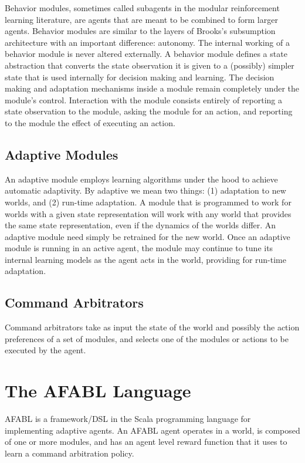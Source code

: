 Behavior modules, sometimes called subagents in the modular reinforcement learning literature, are agents that are meant to be combined to form larger agents.  Behavior modules are similar to the layers of Brooks's subsumption architecture with an important difference: autonomy.  The internal working of a behavior module is never altered externally.  A behavior module defines a state abstraction that converts the state observation it is given to a (possibly) simpler state that is used internally for decision making and learning.  The decision making and adaptation mechanisms inside a module remain completely under the module's control.  Interaction with the module consists entirely of reporting a state observation to the module, asking the module for an action, and reporting to the module the effect of executing an action.

\subsection{Adaptive Modules}

An adaptive module employs learning algorithms under the hood to achieve automatic adaptivity.  By adaptive we mean two things: (1) adaptation to new worlds, and (2) run-time adaptation.  A module that is programmed to work for worlds with a given state representation will work with any world that provides the same state representation, even if the dynamics of the worlds differ.  An adaptive module need simply be retrained for the new world.  Once an adaptive module is running in an active agent, the module may continue to tune its internal learning models as the agent acts in the world, providing for run-time adaptation.

\subsection{Command Arbitrators}

Command arbitrators take as input the state of the world and possibly the action preferences of a set of modules, and selects one of the modules or actions to be executed by the agent.

\section{The AFABL Language}

AFABL is a framework/DSL in the Scala programming language for implementing adaptive agents. An AFABL agent operates in a world, is composed of one or more modules, and has an agent level reward function that it uses to learn a command arbitration policy.

